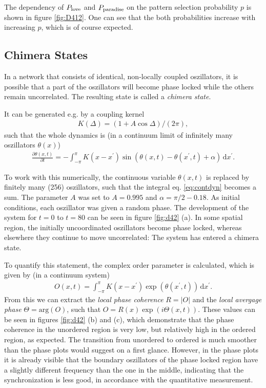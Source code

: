 \documentclass{scrartcl}
\begin{document}
The dependency of $P_{\mathrm{love}}$ and $P_{\mathrm{paradise}}$ on the pattern
selection probability $p$ is shown in figure \ref{fig:D412}. One can
see that the both probabilities increase with increasing $p$, which is
of course expected.

\subsection{Chimera States}
In a network that consists of identical, non-locally coupled oszillators, it is possible 
that a part of the oszillators will become phase locked while the others remain uncorrelated.
The resulting state is called a \emph{chimera state}.

It can be generated e.g. by a coupling kernel 
\begin{align}
K(\Delta) = (1 + A \cos{\Delta}) / (2 \pi),
\end{align}
such that the whole dynamics is (in a continuum limit of infinitely many oszillators $\theta(x)$)
\begin{align}
 \frac{\partial \theta(x, t)}{\partial t} = - \int_{-\pi}^{\pi} K(x-x^\prime) \sin \left( \theta(x, t) - \theta(x^\prime, t) + \alpha \right) \, \mathrm{d} x^\prime. \label{eq:contdyn}
\end{align}

To work with this numerically, the continuous variable $\theta(x, t)$ is replaced by finitely many (256) oszillators, such that the integral eq. \ref{eq:contdyn} becomes a sum. The parameter $A$ was set to $A= 0.995$ and $\alpha = \pi/2 - 0.18$. As initial conditions, each oszillator was given a random phase. 
The development of the system for $t=0$ to $t=80$ can be seen in figure \ref{fig:d42} (a).
In some spatial region, the initially uncoordinated oszillators become phase locked, whereas elsewhere they continue to move uncorrelated: The system has entered a chimera state.

To quantify this statement, the complex order parameter is calculated, which is given by (in a continuum system)
\begin{align}
 O(x, t) = \int_{-\pi}^{\pi} K(x-x^\prime) \exp( \theta(x^\prime, t)) \, \mathrm{d} x^\prime. \label{eq:orderparameter}
\end{align} 
From this we can extract the \emph{local phase coherence} $R = |O|$ and the \emph{local avergage phase} $\Theta = \mathrm{arg}(O)$, such that
$O = R(x) \exp( i \Theta(x, t) )$. 
These values can be seen in figures \ref{fig:d42} (b) and (c), which demonstrate that the phase coherence in the unordered region is very low, but relatively high in the ordered region, as expected. 
The transition from unordered to ordered is much smoother than the phase plots would suggest on a first glance.
However, in the phase plots it is already visible that the boundary oszillators of the phase locked region have a slightly different frequency than the one in the middle, indicating that the synchronization is less good, in accordance with the quantitative measurement.
\end{document}
